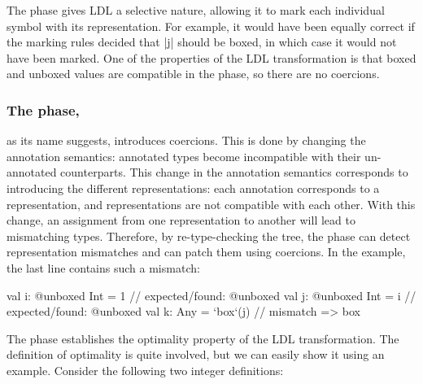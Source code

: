 \vspace{-0.9em}
The \inject{} phase gives LDL a selective nature, al\-low\-ing it to mark
each individual symbol with its representation. For example, it would
have been equally correct if the marking rules decided that |j| should
be boxed, in which case it would not have been marked. One of
the properties of the LDL transformation is that boxed and unboxed
values are compatible in the \inject{} phase, so there are no coercions.

\vspace{-0.3em}
\subsubsection{The \coerce{} phase,} as its name suggests, introduces coercions. This is done by changing the annotation semantics: annotated types become incompatible with their un-annotated counterparts. This change in the annotation semantics corresponds to introducing the different representations: each annotation corresponds to a representation, and representations are not compatible with each other. With this change, an assignment from one representation to another will lead to mismatching types. Therefore, by re-type-checking the tree, the \coerce{} phase can detect representation mismatches and can patch them using coercions. In the example, the last line contains such a mismatch:


\begin{lstlisting-nobreak}
val i: @unboxed Int = 1 // expected/found: @unboxed
val j: @unboxed Int = i // expected/found: @unboxed
val k: Any = `box`(j)             // mismatch => box
\end{lstlisting-nobreak}

The \coerce{} phase establishes the optimality property of the LDL
transformation. The definition of optimality is quite involved,
but we can easily show it using an example.
Consider the following two integer definitions:


